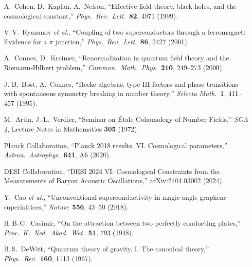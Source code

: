 \documentclass[11pt,a4paper]{article}
\begin{document}
\begin{enumerate}[label={[\arabic*]}]
\item A.~Cohen, D.~Kaplan, A.~Nelson,
  ``Effective field theory, black holes, and the cosmological constant,''
  \textit{Phys.\ Rev.\ Lett.}\ \textbf{82}, 4971 (1999).
  \label{ref:CKN}

\item V.\,V.~Ryazanov \textit{et al.},
  ``Coupling of two superconductors through a ferromagnet:
  Evidence for a $\pi$ junction,''
  \textit{Phys.\ Rev.\ Lett.}\ \textbf{86}, 2427 (2001).

\item A.~Connes, D.~Kreimer,
  ``Renormalization in quantum field theory and the Riemann-Hilbert problem,''
  \textit{Commun.\ Math.\ Phys.}\ \textbf{210}, 249--273 (2000).

\item J.-B.~Bost, A.~Connes,
  ``Hecke algebras, type III factors and phase transitions with
  spontaneous symmetry breaking in number theory,''
  \textit{Selecta Math.}\ \textbf{1}, 411--457 (1995).

\item M.~Artin, J.-L.~Verdier,
  ``Seminar on \'Etale Cohomology of Number Fields,''
  \textit{SGA 4}, Lecture Notes in Mathematics \textbf{305} (1972).

\item Planck Collaboration,
  ``Planck 2018 results. VI. Cosmological parameters,''
  \textit{Astron.\ Astrophys.}\ \textbf{641}, A6 (2020).

\item DESI Collaboration,
  ``DESI 2024 VI: Cosmological Constraints from the Measurements of
  Baryon Acoustic Oscillations,'' arXiv:2404.03002 (2024).

\item Y.~Cao \textit{et al.},
  ``Unconventional superconductivity in magic-angle graphene superlattices,''
  \textit{Nature}\ \textbf{556}, 43--50 (2018).

\item H.\,B.\,G.~Casimir,
  ``On the attraction between two perfectly conducting plates,''
  \textit{Proc.\ K.\ Ned.\ Akad.\ Wet.}\ \textbf{51}, 793 (1948).

\item B.\,S.~DeWitt,
  ``Quantum theory of gravity. I. The canonical theory,''
  \textit{Phys.\ Rev.}\ \textbf{160}, 1113 (1967).
\end{enumerate}
\end{document}
